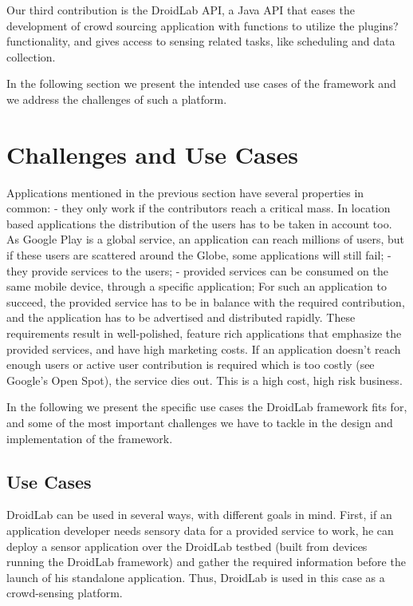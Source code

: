 \documentclass[conference,letterpaper]{IEEEtran}
\begin{document}
Our third contribution is the DroidLab API, a Java API that eases the development of crowd sourcing application with functions to utilize the plugins? functionality, and gives access to sensing related tasks, like scheduling and data collection.

In the following section we present the intended use cases of the framework and we address the challenges of such a platform.

\section{Challenges and Use Cases}
Applications mentioned in the previous section have several properties in common:
- they only work if the contributors reach a critical mass. In location based applications the distribution of the users has to be taken in account too. As Google Play is a global service, an application can reach millions of users, but if these users are scattered around the Globe, some applications will still fail;
- they provide services to the users;
- provided services can be consumed on the same mobile device, through a specific application;
For such an application to succeed, the provided service has to be in balance with the required contribution, and the application has to be advertised and distributed rapidly. These requirements result in well-polished, feature rich applications that emphasize the provided services, and have high marketing costs. If an application doesn't reach enough users or active user contribution is required which is too costly (see Google's Open Spot), the service dies out. This is a high cost, high risk business.

In the following we present the specific use cases the DroidLab framework fits for, and some of the most important challenges we have to tackle in the design and implementation of the framework. 

\subsection{Use Cases}

DroidLab can be used in several ways, with different goals in mind. First, if an application developer needs sensory data for a provided service to work, he can deploy a sensor application over the DroidLab testbed (built from devices running the DroidLab framework) and gather the required information before the launch of his standalone application. Thus, DroidLab is used in this case as a crowd-sensing platform.
\end{document}
